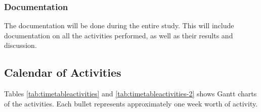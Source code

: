 \subsubsection{Documentation}
The documentation will be done during the entire study. This will include documentation on all the activities performed, as well as their results and discussion.

\subsection{Calendar of Activities}
Tables \ref{tab:timetableactivities} and \ref{tab:timetableactivities-2} shows Gantt charts of the activities.  Each bullet represents approximately
one week worth of activity.

%
%
\newcommand{\weekone}{\textbullet}
\newcommand{\weektwo}{\textbullet \textbullet}
\newcommand{\weekthree}{\textbullet \textbullet \textbullet}
\newcommand{\weekfour}{\textbullet \textbullet \textbullet \textbullet}

%
%
\begin{comment}
   \newcommand{\weekone}{$\star$}
   \newcommand{\weektwo}{$\star \star$}
   \newcommand{\weekthree}{$\star \star \star$}
   \newcommand{\weekfour}{$\star \star \star \star$ }
\end{comment}

